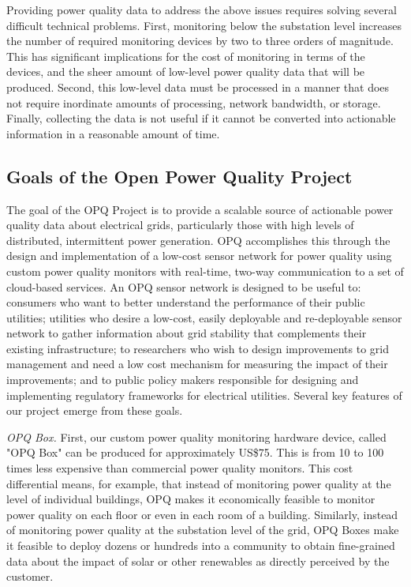 Providing power quality data to address the above issues requires solving several difficult technical problems. First, monitoring below the substation level increases the number of required monitoring devices by two to three orders of magnitude. This has significant implications for the cost of monitoring in terms of the devices, and the sheer amount of low-level power quality data that will be produced. Second, this low-level data must be processed in a manner that does not require inordinate amounts of processing, network bandwidth, or storage. Finally, collecting the data is not useful if it cannot be converted into actionable information in a reasonable amount of time.

\subsection{Goals of the Open Power Quality Project}

The goal of the OPQ Project is to provide a scalable source of actionable power quality data about electrical grids, particularly those with high levels of distributed, intermittent power generation. OPQ accomplishes this through the design and implementation of a low-cost sensor network for power quality using custom power quality monitors with real-time, two-way communication to a set of cloud-based services. An OPQ sensor network is designed to be useful to: consumers who want to better understand the performance of their public utilities; utilities who desire a low-cost, easily deployable and re-deployable sensor network to gather information about grid stability that complements their existing infrastructure; to researchers who wish to design improvements to grid management and need a low cost mechanism for measuring the impact of their improvements; and to public policy makers responsible for designing and implementing regulatory frameworks for electrical utilities.  Several key features of our project emerge from these goals.

{\em OPQ Box.} First, our custom power quality monitoring hardware device, called "OPQ Box" can be produced for approximately US\$75. This is from 10 to 100 times less expensive than commercial power quality monitors. This cost differential means, for example, that instead of monitoring power quality at the level of individual buildings, OPQ makes it economically feasible to monitor power quality on each floor or even in each room of a building. Similarly, instead of monitoring power quality at the substation level of the grid, OPQ Boxes make it feasible to deploy dozens or hundreds into a community to obtain fine-grained data about the impact of solar or other renewables as directly perceived by the customer.

